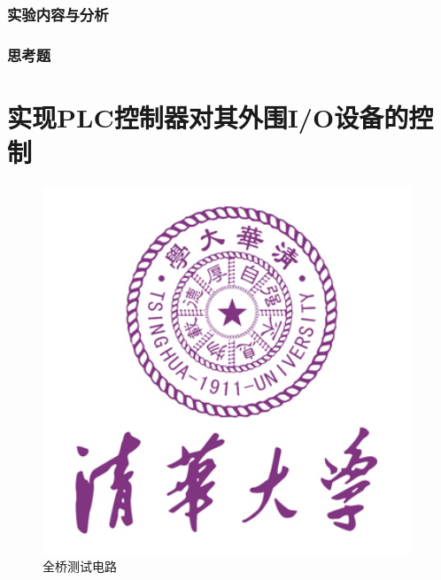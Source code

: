 \section{实验内容与分析}
\section{思考题}
\part{实现PLC控制器对其外围I/O设备的控制}

\begin{figure}[htbp]
\centering
\includegraphics[width=11cm]{resource/logo.jpg}
\caption{全桥测试电路}
\label{fig:fullarm}
\end{figure}



